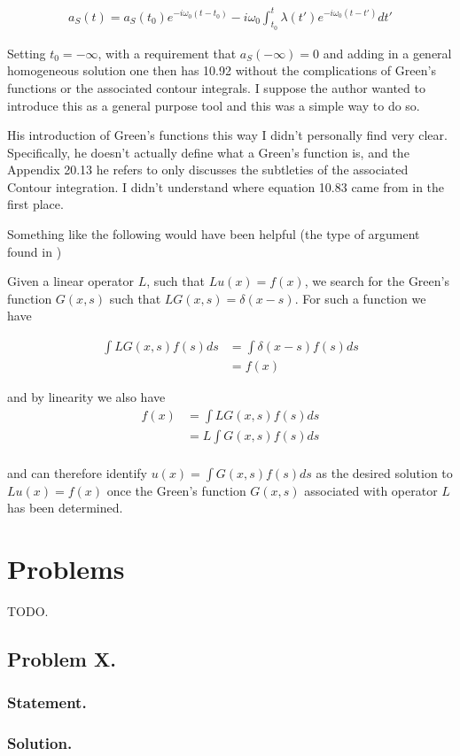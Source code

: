\begin{align}\label{eqn:desaiCh10:5}
a_S(t) = a_S(t_0) e^{-i \omega_0 (t - t_0)} - i \omega_0 \int_{t_0}^t \lambda(t') e^{-i \omega_0 (t-t')} dt'
\end{align}

Setting $t_0 = -\infty$, with a requirement that $a_S(-\infty) = 0$ and adding in a general homogeneous solution one then has 10.92 without the complications of Green's functions or the associated contour integrals.  I suppose the author wanted to introduce this as a general purpose tool and this was a simple way to do so.

His introduction of Green's functions this way I didn't personally find very clear.  Specifically, he doesn't actually define what a Green's function is, and the Appendix 20.13 he refers to only discusses the subtleties of the associated Contour integration.  I didn't understand where equation 10.83 came from in the first place.

Something like the following would have been helpful (the type of argument found in \cite{wiki:greens})

Given a linear operator $L$, such that $L u(x) = f(x)$, we search for the Green's function $G(x,s)$ such that $L G(x,s) = \delta(x-s)$.  For such a function we have

\begin{align*}
\int L G(x,s) f(s) ds 
&= \int \delta(x-s) f(s) ds \\
&= f(x)
\end{align*}

and by linearity we also have
\begin{align*}
f(x) 
&=
\int L G(x,s) f(s) ds \\
&= L \int G(x,s) f(s) ds \\
\end{align*}

and can therefore identify $u(x) = \int G(x,s) f(s) ds$ as the desired solution to $L u(x) = f(x)$ once the Green's function $G(x,s)$ associated with operator $L$ has been determined.

\section{Problems}
TODO.
\subsection{Problem X.}
\subsubsection{Statement.}
\subsubsection{Solution.}

\EndArticle
